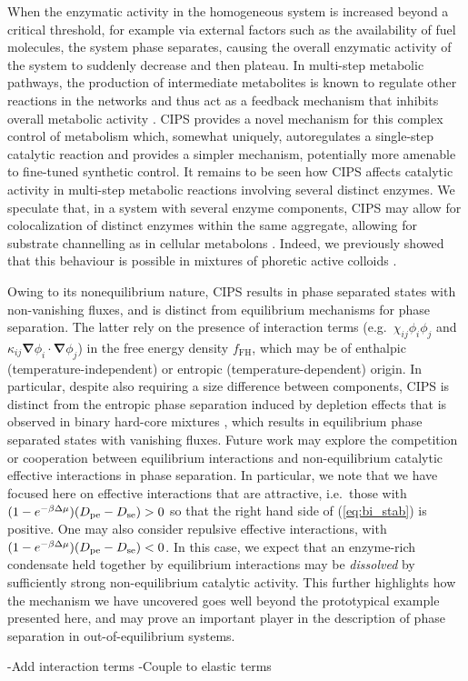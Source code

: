 When the enzymatic activity in the homogeneous system is increased beyond a critical threshold, for example via external factors such as the availability of fuel molecules, the system phase separates, causing the overall enzymatic activity of the system to suddenly decrease and then plateau.
In multi-step metabolic pathways, the production of intermediate metabolites is known to regulate other reactions in the networks and thus act as a feedback mechanism that inhibits overall metabolic activity \cite{o2012dynamic,alam2017self}. CIPS provides a novel mechanism for this complex control of metabolism which, somewhat uniquely, autoregulates a single-step catalytic reaction and provides a simpler mechanism, potentially more amenable to fine-tuned synthetic control.
It remains to be seen how CIPS affects catalytic activity in multi-step metabolic reactions involving several distinct enzymes. We speculate that, in a system with several enzyme components, CIPS may allow for colocalization of distinct enzymes within the same aggregate, allowing for substrate channelling as in cellular metabolons \cite{poshyvailoDoesMetaboliteChanneling2017,sweetloveRoleDynamicEnzyme2018}. Indeed, we previously showed that this behaviour is possible in mixtures of phoretic active colloids \cite{agudo-canalejoActivePhaseSeparation2019}.

Owing to its nonequilibrium nature, CIPS results in phase separated states with non-vanishing fluxes, and is distinct from equilibrium mechanisms for phase separation. The latter rely on the presence of interaction terms (e.g.~$\chi_{ij}\phi_i\phi_j$ and $\kappa_{ij}\bm{\nabla} \phi_i \cdot \bm{\nabla} \phi_j$) in the free energy density $f_\mathrm{FH}$, which may be of enthalpic (temperature-independent) or entropic (temperature-dependent) origin. In particular, despite also requiring a size difference between components, CIPS is distinct from the entropic phase separation induced by depletion effects that is observed in binary hard-core mixtures \cite{frenkel1992phase}, which results in equilibrium phase separated states with vanishing fluxes.
Future work may explore the competition or cooperation between equilibrium interactions and non-equilibrium catalytic effective interactions in phase separation.
In particular, we note that we have focused here on effective interactions that are attractive, i.e.~those with $(1-e^{-\beta \Delta \mu})(D_{\mathrm{pe}}-D_{\mathrm{se}})>0$ so that the right hand side of (\ref{eq:bi_stab}) is positive. One may also consider repulsive effective interactions, with $(1-e^{-\beta \Delta \mu})(D_{\mathrm{pe}}-D_{\mathrm{se}})<0$. In this case, we expect that an enzyme-rich condensate held together by equilibrium interactions may be {\it dissolved} by sufficiently strong non-equilibrium catalytic activity. This further highlights how the mechanism we have uncovered goes well beyond the prototypical example presented here, and may prove an important player in the description of phase separation in out-of-equilibrium systems.

-Add interaction terms
-Couple to elastic terms
